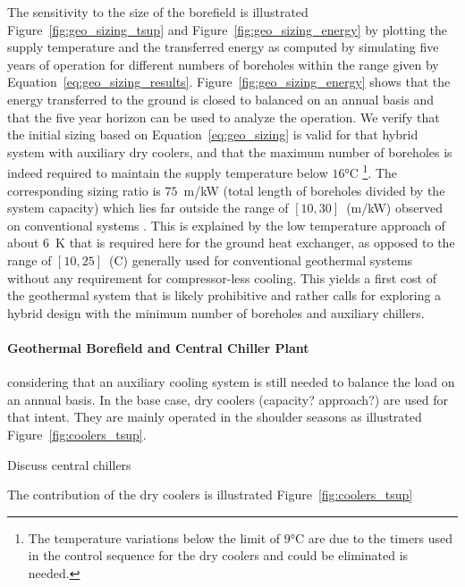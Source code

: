 The sensitivity to the size of the borefield is illustrated Figure~\ref{fig:geo_sizing_tsup} and Figure~\ref{fig:geo_sizing_energy} by plotting the supply temperature and the transferred energy as computed by simulating five years of operation for different numbers of boreholes within the range given by Equation~\ref{eq:geo_sizing_results}.
Figure~\ref{fig:geo_sizing_energy} shows that the energy transferred to the ground is closed to balanced on an annual basis and that the five year horizon can be used to analyze the operation.
We verify that the initial sizing based on Equation~\ref{eq:geo_sizing} is valid for that hybrid system with auxiliary dry coolers, and that the maximum number of boreholes is indeed required to maintain the supply temperature below $16$°C%
\footnote{%
The temperature variations below the limit of $9$°C are due to the timers used in the control sequence for the dry coolers and could be eliminated is needed.}.
The corresponding sizing ratio is $75$~m/kW (total length of boreholes divided by the system capacity) which lies far outside the range of $[10, 30]$~(m/kW) observed on conventional systems \citep{Kavanaugh2014}. This is explained by the low temperature approach of about $6$~K that is required here for the ground heat exchanger, as opposed to the range of $[10, 25]$~(C) generally used for conventional geothermal systems without any requirement for compressor-less cooling.
This yields a first cost of the geothermal system that is likely prohibitive and rather calls for exploring a hybrid design with the minimum number of boreholes and auxiliary chillers.


\paragraph{Geothermal Borefield and Central Chiller Plant}

considering that an auxiliary cooling system is still needed to balance the load on an annual basis.
In the base case, dry coolers (capacity? approach?) are used for that intent. They are mainly operated in the shoulder seasons as illustrated Figure~\ref{fig:coolers_tsup}.

Discuss central chillers


The contribution of the dry coolers is illustrated Figure~\ref{fig:coolers_tsup}




